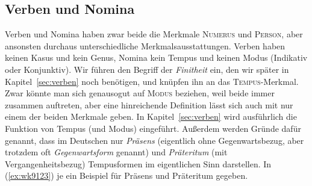 \begin{exe}
  \begin{xlist}
  \end{xlist}
\end{exe}


\subsection{Verben und Nomina}

\label{sec:verbennominawortklassen}


Verben und Nomina haben zwar beide die Merkmale \textsc{Numerus} und \textsc{Person}, aber ansonsten durchaus unterschiedliche Merkmalsausstattungen.
Verben haben keinen Kasus und kein Genus, Nomina kein Tempus und keinen Modus (Indikativ oder Konjunktiv).
Wir führen den Begriff der \textit{Finitheit} ein, den wir später in Kapitel~\ref{sec:verben} noch benötigen, und knüpfen ihn an das \textsc{Tempus}-Merkmal.
Zwar könnte man sich genausogut auf \textsc{Modus} beziehen, weil beide immer zusammen auftreten, aber eine hinreichende Definition lässt sich auch mit nur einem der beiden Merkmale geben.
In Kapitel~\ref{sec:verben} wird ausführlich die Funktion von Tempus (und Modus) eingeführt.
Außerdem werden Gründe dafür genannt, dass im Deutschen nur \textit{Präsens} (eigentlich ohne Gegenwartsbezug, aber trotzdem oft \textit{Gegenwartsform} genannt) und \textit{Präteritum} (mit Vergangenheitsbezug) Tempusformen im eigentlichen Sinn darstellen.
In (\ref{ex:wk9123}) je ein Beispiel für Präsens und Präteritum gegeben.

\begin{exe}
  \ex\label{ex:wk9123}
  \begin{xlist}
  \end{xlist}
\end{exe}


